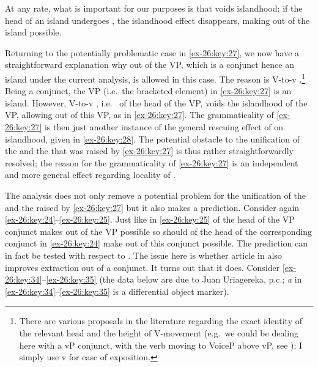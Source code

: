 \documentclass[output=paper]{langsci/langscibook}
\begin{document}
At any rate, what is important for our purposes is that  voids
islandhood: if the head of an island undergoes , the islandhood effect
disappears, making  out of the island possible.

Returning to the potentially problematic case in \eqref{ex-26:key:27}, we now have a
straightforward explanation why  out of the VP, which is a conjunct
hence an island under the current analysis, is allowed in this case. The reason
is V-to-v .\footnote{ There are various proposals in the literature
    regarding the exact identity of the relevant head and the height of
    V-movement (e.g.\ we could be dealing here with a vP conjunct, with the
    verb moving to VoiceP above vP, see \citealt{Collins2005}); I simply use v
    for ease of exposition.} Being a conjunct, the VP (i.e.\ the bracketed
    element) in \eqref{ex-26:key:27} is an island. However, V-to-v , i.e.\  of
    the head of the VP, voids the islandhood of the VP, allowing  out
    of this VP, as in \eqref{ex-26:key:27}. The grammaticality of \eqref{ex-26:key:27} is then just another
    instance of the general rescuing effect of  on islandhood,
    given in \eqref{ex-26:key:28}. The potential obstacle to the unification of the 
    and the  that was raised by \eqref{ex-26:key:27} is thus rather straightforwardly
    resolved; the reason for the grammaticality of \eqref{ex-26:key:27} is an independent and
    more general effect regarding locality of .

The analysis does not only remove a potential problem for the unification of
the  and the  raised by \eqref{ex-26:key:27} but it also makes a prediction.
Consider again \eqref{ex-26:key:24}--\eqref{ex-26:key:25}. Just like in \eqref{ex-26:key:25}  of the head of the VP
conjunct makes  out of the VP possible so should  of the head
of the corresponding conjunct in \eqref{ex-26:key:24} make  out of this conjunct
possible. The prediction can in fact be tested with respect to . The
issue here is whether article  in  also improves
extraction out of a conjunct. It turns out that it does. Consider \eqref{ex-26:key:34}--\eqref{ex-26:key:35}
(the  data below are due to Juan Uriagereka, p.c.; \emph{a} in
\eqref{ex-26:key:34}--\eqref{ex-26:key:35} is a differential object
marker).
\end{document}
